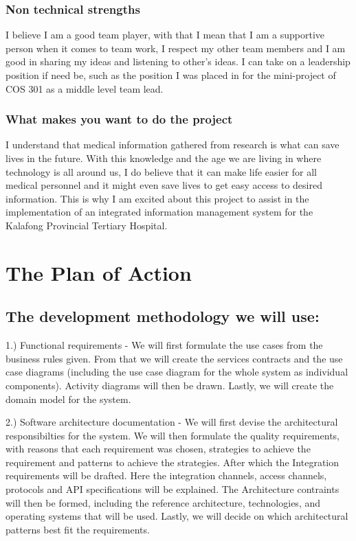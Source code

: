 \documentclass[hidelinks, 12pt, oneside]{article}
\begin{document}
\subsubsection{Non technical strengths}
I believe I am a good team player, with that I mean that I am a supportive
person when it comes to team work, I respect my other team members and
I am good in sharing my ideas and listening to other's ideas. I can take on
a leadership position if need be, such as the position I was placed in for the
mini-project of COS 301 as a middle level team lead.

\subsubsection{What makes you want to do the project}
I understand that medical information gathered from research is what can save lives in the future. With this knowledge and the age we are living in where technology is all around us, I do believe that it can make life easier for all medical personnel and it might even   save lives to get easy access to desired information. This is why I am excited about this project to assist in  the implementation of an integrated information management system  for the Kalafong Provincial Tertiary Hospital.

\section{The Plan of Action}

 
 
\subsection{The development methodology we will use:}

1.) Functional requirements -  We will first formulate the use cases from the business rules given. From that we will create the services contracts and the use case diagrams (including the use case diagram for the whole system as individual components). Activity diagrams will then be drawn. Lastly, we will create the domain model for the system.

2.) Software architecture documentation - We will first devise the architectural responsibilties for the system. We will then formulate the quality requirements, with reasons that each requirement was chosen, strategies to achieve the requirement and patterns to achieve the strategies. After which the Integration requirements will be drafted. Here the integration channels, access channels, protocols and API specifications will be explained. The Architecture contraints will then be formed, including the reference architecture, technologies, and operating systems that will be used. Lastly, we will decide on which architectural patterns best fit the requirements. 
\end{document}
